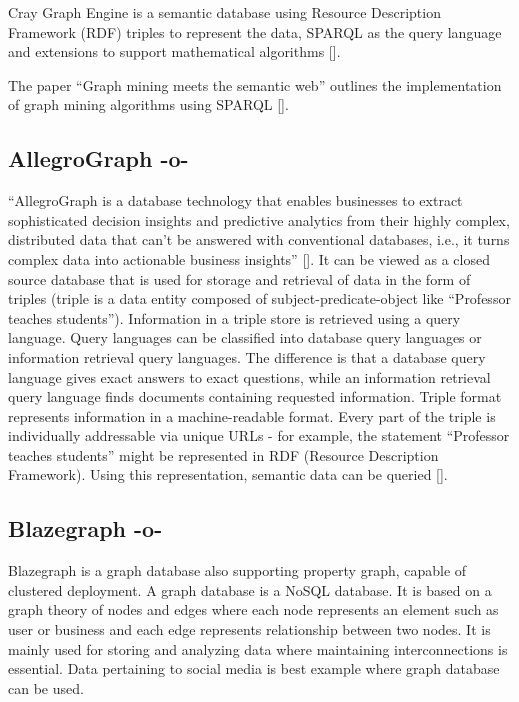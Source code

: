 Cray Graph Engine is a semantic database using Resource Description
Framework (RDF) triples to represent the data, SPARQL as the query
language and extensions to support mathematical
algorithms [\cite{paper-graph-data}].

The paper ``Graph mining meets the semantic web'' outlines the
implementation of graph mining algorithms using
SPARQL [\cite{paper-lee2015graph}].



\subsection{AllegroGraph -o-}
     
``AllegroGraph is a database technology that enables businesses to
extract sophisticated decision insights and predictive analytics from
their highly complex, distributed data that can't be answered with
conventional databases, i.e., it turns complex data into actionable
business insights'' [\cite{www-Allegro}]. It can be viewed as a closed
source database that is used for storage and retrieval of data in the
form of triples (triple is a data entity composed of
subject-predicate-object like ``Professor teaches students'').
Information in a triple store is retrieved using a query
language. Query languages can be classified into database query
languages or information retrieval query languages. The difference is
that a database query language gives exact answers to exact questions,
while an information retrieval query language finds documents
containing requested information.  Triple format represents
information in a machine-readable format.  Every part of the triple is
individually addressable via unique URLs - for example, the statement
``Professor teaches students'' might be represented in RDF (Resource
Description Framework). Using this representation, semantic data can
be queried [\cite{www-Allegrow}].



\subsection{Blazegraph -o-}

Blazegraph is a graph database also supporting property graph, capable
of clustered deployment. A graph database is a NoSQL database. It is
based on a graph theory of nodes and edges where each node represents
an element such as user or business and each edge represents
relationship between two nodes. It is mainly used for storing and
analyzing data where maintaining interconnections is essential. Data
pertaining to social media is best example where graph database can be
used.

